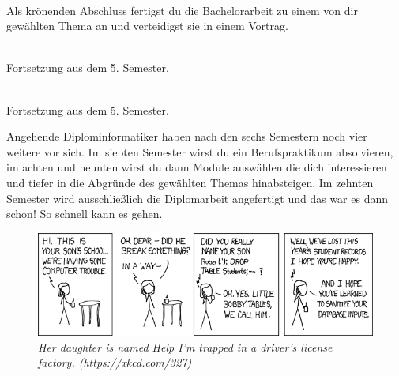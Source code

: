 \textbf{} \\
Als krönenden Abschluss fertigst du die Bachelorarbeit zu einem von dir gewählten Thema an und verteidigst sie in einem Vortrag.

\textbf{} \\
Fortsetzung aus dem 5. Semester.

\textbf{} \\
Fortsetzung aus dem 5. Semester.


Angehende Diplominformatiker haben nach den sechs Semestern noch vier weitere vor sich.
Im siebten Semester wirst du ein Berufspraktikum absolvieren, im achten und neunten wirst du dann Module auswählen die dich interessieren und tiefer in die Abgründe des gewählten Themas hinabsteigen.
Im zehnten Semester wird ausschließlich die Diplomarbeit angefertigt und das war es dann schon!
So schnell kann es gehen.

\vfill

\begin{figure}[h!]
\centering
\includegraphics[scale=.5]{img/xkcd/exploits_of_a_mom.png}
\caption*{{\small \textit{Her daughter is named Help I'm trapped in a driver's license factory. (https://xkcd.com/327)}}}
\end{figure}
